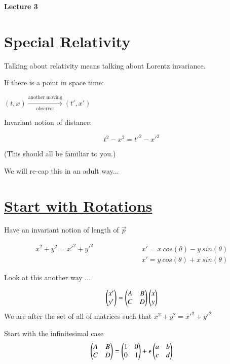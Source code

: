 \thispagestyle{fancy}

\begin{center}
{\huge \textbf{Lecture 3}}
\end{center}

{\fontsize{14}{16}\selectfont


\section*{Special Relativity}

Talking about relativity means talking about Lorentz invariance.

If there is a point in space time: \\
\begin{center}
$(t,x) \xrightarrow[\text{observer}]{\text{another moving}} (t', x')$
\end{center}

Invariant notion of distance:
 
\begin{equation*}
t^2 - x^2 = t'^2 - x'^2
\end{equation*}

(This should all be familiar to you.)

We will re-cap this in an adult way...

\section*{\underline{Start with Rotations}}

Have an invariant notion of length of $\vec{p}$

\begin{eqnarray*}
x^2 + y^2 = x'^2 + y'^2  \hspace{1in} & x' = x\ cos(\theta) - y\ sin(\theta) \\
                          &  x' = y\ cos(\theta) + x\ sin(\theta)
\end{eqnarray*}

Look at this another way ... 

\begin{equation*}
\begin{pmatrix} x' \\ y' \end{pmatrix} = \begin{pmatrix} A & B \\ C & D \end{pmatrix} \begin{pmatrix} x \\ y \end{pmatrix}  
\end{equation*}
We are after the set of all of matrices such that  $x^2 + y^2 = x'^2 + y'^2$

Start with the infinitesimal case
\begin{equation*}
\begin{pmatrix} A & B \\ C & D \end{pmatrix} = \begin{pmatrix} 1 &  0  \\ 0 & 1 \end{pmatrix} + \epsilon \begin{pmatrix} a & b  \\ c & d \end{pmatrix}
\end{equation*}

}
